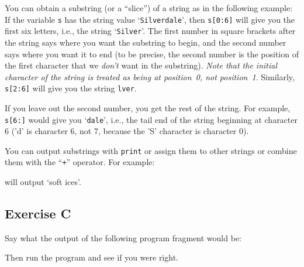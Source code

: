 You can obtain a substring (or a ``slice'')
of a string as in the %
following example:
If the variable \verb!s! has the string value `\verb!Silverdale!', then
\verb!s[0:6]! will give you the first six letters, i.e., the string
`\verb!Silver!'.  The first number in square brackets
after the string
says where you want the substring to begin, and the second number says
where you want it to end (to be precise, the second number is the
position of the first character that we \emph{don't} want in the
substring). \emph{Note that the initial character of the string
is treated as being at position~0, not position~1}.
Similarly, \verb!s[2:6]! will give you the string \verb!lver!.

If you leave out the second number, you get the rest of the string.
For example, \verb!s[6:]! would give you `\verb!dale!', i.e., the
tail end of the string beginning at character 6 ('d' is character 6,
not 7, because the 'S' character is character 0).

You can output substrings with \verb!print! or assign them to other
strings or combine them with the ``\texttt{+}'' operator.  For example:


will output `soft ices'.

\subsection*{Exercise C}

Say what the output of the following program fragment would be:


Then run the program and see if you were right. 




